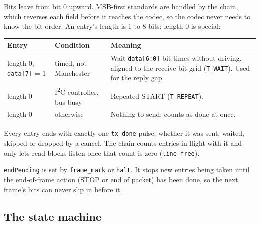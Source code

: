 \documentclass[11pt,a4paper]{article}
\newcommand{\sig}[1]{\texttt{#1}}
\begin{document}
Bits leave from bit 0 upward. MSB-first standards are handled by the chain, which reverses each field before it reaches the codec, so the codec never needs to know the bit order. An entry's length is 1 to 8 bits; length 0 is special:

\begin{center}
\begin{tabularx}{\linewidth}{@{}l l L@{}}
\toprule
Entry & Condition & Meaning \\
\midrule
length 0, \sig{data[7]} = 1 & timed, not Manchester & Wait \sig{data[6:0]} bit times without driving, aligned to the receive bit grid (\sig{T\_WAIT}). Used for the reply gap. \\
length 0 & I\textsuperscript{2}C controller, bus busy & Repeated START (\sig{T\_REPEAT}). \\
length 0 & otherwise & Nothing to send; counts as done at once. \\
\bottomrule
\end{tabularx}
\end{center}

Every entry ends with exactly one \sig{tx\_done} pulse, whether it was sent, waited, skipped or dropped by a cancel. The chain counts entries in flight with it and only lets read blocks listen once that count is zero (\sig{line\_free}).

\sig{endPending} is set by \sig{frame\_mark} or \sig{halt}. It stops new entries being taken until the end-of-frame action (STOP or end of packet) has been done, so the next frame's bits can never slip in before it.

\subsection{The state machine}
\end{document}
